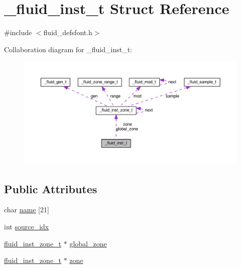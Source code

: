 \hypertarget{struct__fluid__inst__t}{}\section{\+\_\+fluid\+\_\+inst\+\_\+t Struct Reference}
\label{struct__fluid__inst__t}


{\ttfamily \#include $<$fluid\+\_\+defsfont.\+h$>$}



Collaboration diagram for \+\_\+fluid\+\_\+inst\+\_\+t\+:
\nopagebreak
\begin{figure}[H]
\begin{center}
\leavevmode
\includegraphics[width=350pt]{struct__fluid__inst__t__coll__graph}
\end{center}
\end{figure}
\subsection*{Public Attributes}
\begin{DoxyCompactItemize}
\item 
char \hyperlink{struct__fluid__inst__t_ab23fbac1313132d2875e9a140f891360}{name} \mbox{[}21\mbox{]}
\item 
int \hyperlink{struct__fluid__inst__t_afce8fb8979a1c3d4848042a3f1fbf57e}{source\+\_\+idx}
\item 
\hyperlink{fluid__defsfont_8h_aa02ac18b4c58545cc3b297bdf4d933ab}{fluid\+\_\+inst\+\_\+zone\+\_\+t} $\ast$ \hyperlink{struct__fluid__inst__t_a3ba1374703f8f5f269ee9915e8155d1f}{global\+\_\+zone}
\item 
\hyperlink{fluid__defsfont_8h_aa02ac18b4c58545cc3b297bdf4d933ab}{fluid\+\_\+inst\+\_\+zone\+\_\+t} $\ast$ \hyperlink{struct__fluid__inst__t_a3ee3921ad01c3cdd87b35e32ba9fea4e}{zone}
\end{DoxyCompactItemize}


